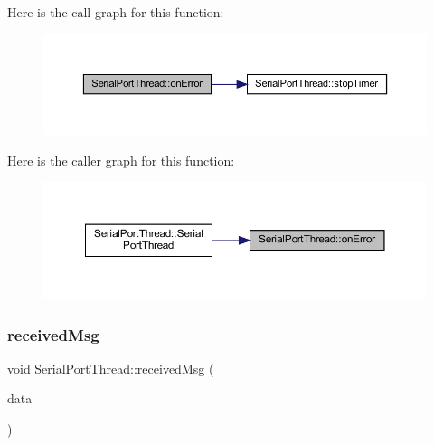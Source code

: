 Here is the call graph for this function\+:
\nopagebreak
\begin{figure}[H]
\begin{center}
\leavevmode
\includegraphics[width=350pt]{class_serial_port_thread_a1f0e27279ed5e305f0f71caec3a835f8_cgraph}
\end{center}
\end{figure}
Here is the caller graph for this function\+:
\nopagebreak
\begin{figure}[H]
\begin{center}
\leavevmode
\includegraphics[width=350pt]{class_serial_port_thread_a1f0e27279ed5e305f0f71caec3a835f8_icgraph}
\end{center}
\end{figure}
\mbox{\label{class_serial_port_thread_ac076c2d960a1464de8e88e703ad00dc5}} 
\subsubsection{\texorpdfstring{receivedMsg}{receivedMsg}}
{\footnotesize\ttfamily void Serial\+Port\+Thread\+::received\+Msg (\begin{DoxyParamCaption}\item[{Q\+Byte\+Array}]{data }\end{DoxyParamCaption})\hspace{0.3cm}{\ttfamily [signal]}}

